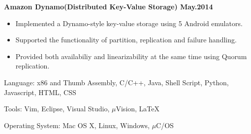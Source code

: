 \documentclass{myres}
\begin{document}
{	\par
	\smallskip

	\textbf{Amazon Dynamo(Distributed Key-Value Storage) \hfill May.2014}
	\begin{itemize}[topsep=0pt, leftmargin=0.2in] \itemsep -5pt
			\item Implemented a Dynamo-style key-value storage using 5 Android emulators.
			\item Supported the functionality of partition, replication and failure handling.
			\item Provided both availabiliy and linearizability at the same time using Quorum replication. 
	\end{itemize}
}
{
	Language: x86 and Thumb Assembly, C/C++, Java, Shell Script, Python, Javascript, HTML, CSS
	\par
	Tools: Vim, Eclipse, Visual Studio, $\mu$Vision, \LaTeX
	\par
	Operating System: Mac OS X, Linux, Windows, $\mu$C/OS
}
%
\end{document}
